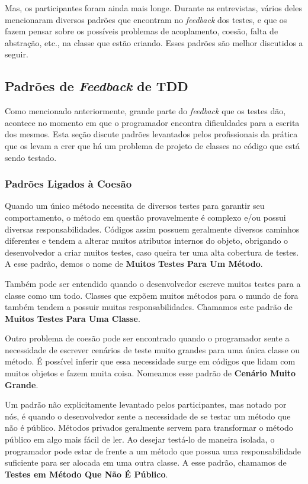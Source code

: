 \documentclass[conference]{IEEEtran}
\begin{document}
Mas, os participantes foram ainda mais longe. Durante as entrevistas,
vários deles mencionaram diversos padrões que encontram no \textit{feedback} dos testes,
e que os fazem pensar sobre os possíveis problemas de acoplamento,
coesão, falta de abstração, etc., na classe que estão criando.
Esses padrões são melhor discutidos a seguir.

\subsection{Padrões de \textit{Feedback} de TDD}
\label{padroes-tdd}

Como mencionado anteriormente, grande parte do \textit{feedback} que os testes
dão, acontece no momento em que o programador encontra dificuldades para a
escrita dos mesmos. Esta seção discute padrões levantados pelos profissionais da prática
que os levam a crer que há um problema de projeto de classes no código
que está sendo testado.

\subsubsection{Padrões Ligados à Coesão}

Quando um único método necessita de diversos testes para garantir seu comportamento,
o método em questão provavelmente é complexo e/ou possui diversas responsabilidades.
Códigos assim possuem geralmente diversos caminhos
diferentes e tendem a alterar muitos atributos internos do objeto, obrigando o desenvolvedor
a criar muitos testes, caso queira ter uma alta cobertura de testes.
A esse padrão, demos o nome de \textbf{Muitos Testes Para Um Método}.

Também pode ser entendido quando o desenvolvedor escreve muitos testes para a 
classe como um todo. Classes que expõem muitos métodos para o mundo de fora
também tendem a possuir muitas responsabilidades. Chamamos este padrão
de \textbf{Muitos Testes Para Uma Classe}.

Outro problema de coesão pode ser encontrado quando o programador
sente a necessidade de escrever cenários de teste muito grandes para uma
única classe ou método. É possível inferir que essa necessidade surge 
em códigos que lidam com muitos objetos e fazem muita coisa. Nomeamos
esse padrão de \textbf{Cenário Muito Grande}.

Um padrão não explicitamente levantado pelos participantes, mas notado
por nós, é quando o desenvolvedor sente a necessidade de se testar
um método que não é público. Métodos privados geralmente servem para 
transformar o método público em algo mais fácil de ler. Ao desejar
testá-lo de maneira isolada, o programador pode estar de frente a
um método que possua uma responsabilidade suficiente para ser
alocada em uma outra classe. A esse padrão, chamamos de 
\textbf{Testes em Método Que Não É Público}.
\end{document}
